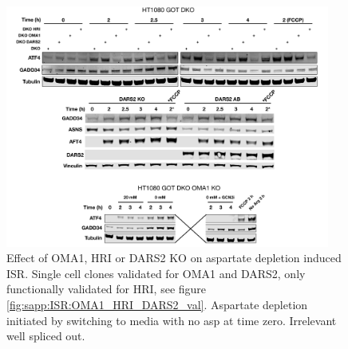 \begin{figure}[ht]
    \centering
    \includegraphics[width=0.95\textwidth]{figures/sapp/ISR/HT1080_DKO_KO_ISR.pdf}
    \caption[ATF4 post Asp depl. OMA1/HRI KO, western]{
    Effect of OMA1, HRI or DARS2 KO on aspartate depletion induced ISR.
    Single cell clones validated for OMA1 and DARS2, only functionally validated for HRI, see figure \ref{fig:sapp:ISR:OMA1_HRI_DARS2_val}.
    Aspartate depletion initiated by switching to media with no asp at time zero.
    Irrelevant well spliced out.
    }
    \label{fig:sapp:ISR:HT1080_DKO_KO_ISR}
\end{figure}

